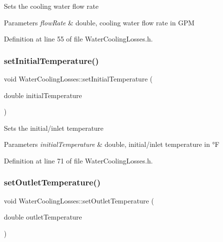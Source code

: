 Sets the cooling water flow rate 
\begin{DoxyParams}{Parameters}
{\em flow\+Rate} & double, cooling water flow rate in G\+PM \\
\hline
\end{DoxyParams}


Definition at line 55 of file Water\+Cooling\+Losses.\+h.

\mbox{\label{class_water_cooling_losses_a56b0b64b71ecbece780622d5f4b536ba}} 
\subsubsection{\texorpdfstring{set\+Initial\+Temperature()}{setInitialTemperature()}}
{\footnotesize\ttfamily void Water\+Cooling\+Losses\+::set\+Initial\+Temperature (\begin{DoxyParamCaption}\item[{double}]{initial\+Temperature }\end{DoxyParamCaption})\hspace{0.3cm}{\ttfamily [inline]}}

Sets the initial/inlet temperature 
\begin{DoxyParams}{Parameters}
{\em initial\+Temperature} & double, initial/inlet temperature in °F \\
\hline
\end{DoxyParams}


Definition at line 71 of file Water\+Cooling\+Losses.\+h.

\mbox{\label{class_water_cooling_losses_a36bb100df0580a78f63f266cdc1d41f5}} 
\subsubsection{\texorpdfstring{set\+Outlet\+Temperature()}{setOutletTemperature()}}
{\footnotesize\ttfamily void Water\+Cooling\+Losses\+::set\+Outlet\+Temperature (\begin{DoxyParamCaption}\item[{double}]{outlet\+Temperature }\end{DoxyParamCaption})\hspace{0.3cm}{\ttfamily [inline]}}

